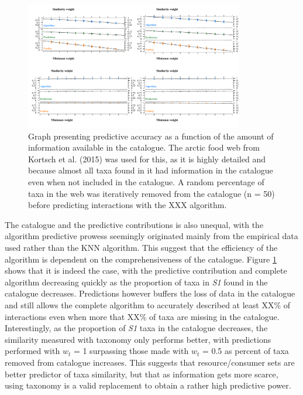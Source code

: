 \documentclass[letterpaper]{article}
\begin{document}

\begin{figure}[h]
  \centering\includegraphics[width=0.85\textwidth]{catalog_predictions2.pdf}
  \caption{Graph presenting predictive accuracy as a function of the amount of information available in the catalogue. The arctic food web from Kortsch et al. (2015) was used for this, as it is highly detailed and because almost all taxa found in it had information in the catalogue even when not included in the catalogue. A random percentage of taxa in the web was iteratively removed from the catalogue (n = 50) before predicting interactions with the XXX algorithm.}
  \label{fig:catalog_pred}
\end{figure}

The catalogue and the predictive contributions is also unequal, with the algorithm predictive prowess seemingly originated mainly from the empirical data used rather than the KNN algorithm. This suggest that the efficiency of the algorithm is dependent on the comprehensiveness of the catalogue. Figure \ref{fig:catalog_pred} shows that it is indeed the case, with the predictive contribution and complete algorithm decreasing quickly as the proportion of taxa in \textit{S1} found in the catalogue decreases. Predictions however buffers the loss of data in the catalogue and still allows the complete algorithm to accurately described at least XX\% of interactions even when more that XX\% of taxa are missing in the catalogue. Interestingly, as the proportion of \textit{S1} taxa in the catalogue decreases, the similarity measured with taxonomy only performs better, with predictions performed with $w_t$ = 1 surpassing those made with $w_t$ = 0.5 as percent of taxa removed from catalogue increases. This suggests that resource/consumer sets are better predictor of taxa similarity, but that as information gets more scarce, using taxonomy is a valid replacement to obtain a rather high predictive power.
\end{document}
